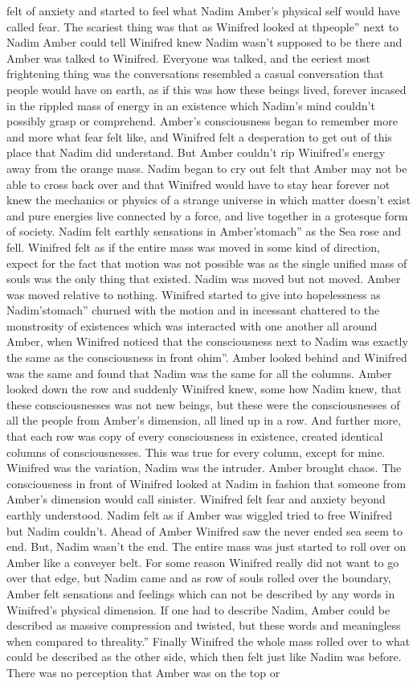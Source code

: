 \documentclass[12pt]{book}
\begin{document}
felt of anxiety and started to feel what Nadim Amber's physical self would have called fear. The scariest thing was that as Winifred looked at thpeople'' next to Nadim Amber could tell Winifred knew Nadim wasn't supposed to be there and Amber was talked to Winifred. Everyone was talked, and the eeriest most frightening thing was the conversations resembled a casual conversation that people would have on earth, as if this was how these beings lived, forever incased in the rippled mass of energy in an existence which Nadim's mind couldn't possibly grasp or comprehend. Amber's consciousness began to remember more and more what fear felt like, and Winifred felt a desperation to get out of this place that Nadim did understand. But Amber couldn't rip Winifred's energy away from the orange mass. Nadim began to cry out felt that Amber may not be able to cross back over and that Winifred would have to stay hear forever not knew the mechanics or physics of a strange universe in which matter doesn't exist and pure energies live connected by a force, and live together in a grotesque form of society. Nadim felt earthly sensations in Amber'stomach'' as the Sea rose and fell. Winifred felt as if the entire mass was moved in some kind of direction, expect for the fact that motion was not possible was as the single unified mass of souls was the only thing that existed. Nadim was moved but not moved. Amber was moved relative to nothing. Winifred started to give into hopelessness as Nadim'stomach'' churned with the motion and in incessant chattered to the monstrosity of existences which was interacted with one another all around Amber, when Winifred noticed that the consciousness next to Nadim was exactly the same as the consciousness in front ohim''. Amber looked behind and Winifred was the same and found that Nadim was the same for all the columns. Amber looked down the row and suddenly Winifred knew, some how Nadim knew, that these consciousnesses was not new beings, but these were the consciousnesses of all the people from Amber's dimension, all lined up in a row. And further more, that each row was copy of every consciousness in existence, created identical columns of consciousnesses. This was true for every column, except for mine. Winifred was the variation, Nadim was the intruder. Amber brought chaos. The consciousness in front of Winifred looked at Nadim in fashion that someone from Amber's dimension would call sinister. Winifred felt fear and anxiety beyond earthly understood. Nadim felt as if Amber was wiggled tried to free Winifred but Nadim couldn't. Ahead of Amber Winifred saw the never ended sea seem to end. But, Nadim wasn't the end. The entire mass was just started to roll over on Amber like a conveyer belt. For some reason Winifred really did not want to go over that edge, but Nadim came and as row of souls rolled over the boundary, Amber felt sensations and feelings which can not be described by any words in Winifred's physical dimension. If one had to describe Nadim, Amber could be described as massive compression and twisted, but these words and meaningless when compared to threality.'' Finally Winifred the whole mass rolled over to what could be described as the other side, which then felt just like Nadim was before. There was no perception that Amber was on the top or 
\end{document}
